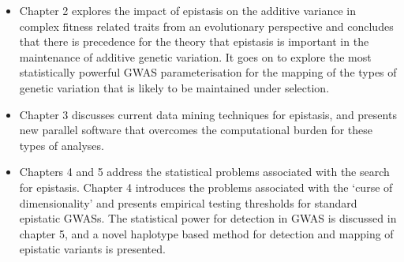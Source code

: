 \begin{itemize}
\item Chapter 2 explores the impact of epistasis on the additive variance in complex fitness related traits from an evolutionary perspective and concludes that there is precedence for the theory that epistasis is important in the maintenance of additive genetic variation. It goes on to explore the most 
statistically powerful GWAS parameterisation for the mapping of the types of genetic variation that is likely to be maintained under selection.
\item Chapter 3 discusses current data mining techniques for epistasis, and presents new parallel software that overcomes the computational burden for these types of analyses.
\item Chapters 4 and 5 address the statistical problems associated with the search for epistasis. Chapter 4 introduces the problems associated with the `curse of dimensionality' and presents empirical testing thresholds for standard epistatic GWASs. The statistical power for detection in GWAS is discussed in chapter 5, and a novel haplotype based method for detection and mapping of epistatic variants is presented.
\end{itemize}

